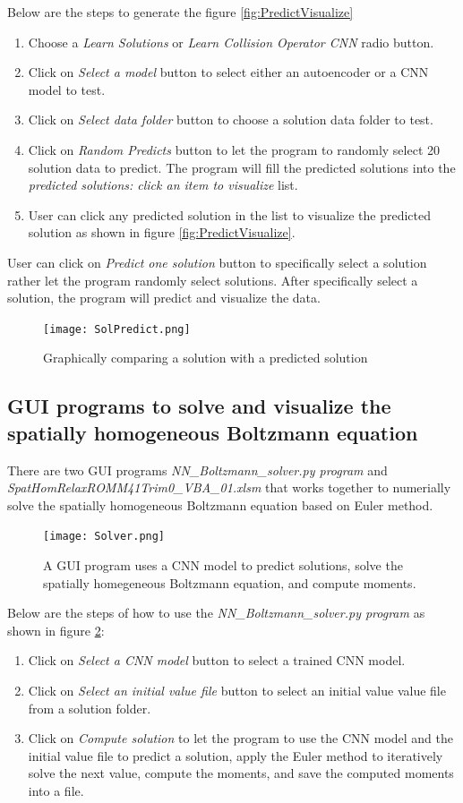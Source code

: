 \documentclass{article}
\begin{document}
Below are the steps to generate the figure \ref{fig:PredictVisualize}
\begin{enumerate}
	\item Choose a \emph{Learn Solutions} or \emph{Learn Collision Operator CNN} radio button.
	\item Click on \emph{Select a model} button to select either an autoencoder or a CNN model to test.
	\item Click on \emph{Select data folder} button to choose a solution data folder to test.
	\item Click on \emph{Random Predicts} button to let the program to randomly select 20 solution data to predict. The program will fill the predicted solutions into the \emph{predicted solutions: click an item to visualize} list.
	\item User can click any predicted solution in the list to visualize the predicted solution as shown in figure \ref{fig:PredictVisualize}.	
\end{enumerate}
User can click on \emph{Predict one solution} button to specifically select a solution rather let the program randomly select solutions. After specifically select a solution, the program will predict and visualize the data.

\begin{figure}[h!]
	\centering
	\texttt{[image: SolPredict.png]}
	\caption{Graphically comparing a solution with a predicted solution}
	\label{fig:SolPredict}
\end{figure} 
\subsection{GUI programs to solve and visualize the spatially homogeneous Boltzmann equation}

There are two GUI programs \emph{NN\_Boltzmann\_solver.py program} and \emph{SpatHomRelaxROMM41Trim0\_VBA\_01.xlsm} that works together to numerially solve the spatially homogeneous Boltzmann equation based on Euler method.
\begin{figure}[h!]
	\centering
	\texttt{[image: Solver.png]}
	\caption{A GUI program uses a CNN model to predict solutions, solve the spatially homegeneous Boltzmann equation, and compute moments. }
	\label{fig:solver}
\end{figure}
Below are the steps of how to use the \emph{NN\_Boltzmann\_solver.py program} as shown in figure \ref{fig:solver}:
\begin{enumerate}
	\item Click on \emph{Select a CNN model} button to select a trained CNN model.
	\item Click on \emph{Select an initial value file} button to select an initial value value file from a solution folder.
	\item Click on \emph{Compute solution} to let the program to use the CNN model and the initial value file to predict a solution, apply the Euler method to iteratively solve the next value, compute the moments, and save the computed moments into a file.
\end{enumerate}
\end{document}
